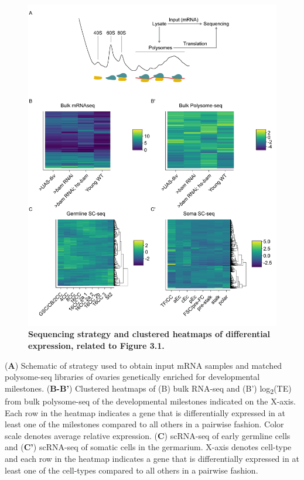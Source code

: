 \documentclass[12pt,oneside]{reedthesis}
\begin{document}
\begin{figure}

{\centering \includegraphics[width=1\linewidth]{./figure/Oo_site/Supplemental_Figure1} 

}

\caption[\textbf{Sequencing strategy and clustered heatmaps of differential expression, related to Figure 3.1.}]{\textbf{Sequencing strategy and clustered heatmaps of differential expression, related to Figure 3.1.}}\label{fig:oosite-fig-2}
\end{figure}

\setlength\parindent{0pt}(\textbf{A}) Schematic of strategy used to obtain input mRNA samples and matched polysome-seq libraries of ovaries genetically enriched for developmental milestones. (\textbf{B-B'}) Clustered heatmaps of (B) bulk RNA-seq and (B') log\textsubscript{2}(TE) from bulk polysome-seq of the developmental milestones indicated on the X-axis. Each row in the heatmap indicates a gene that is differentially expressed in at least one of the milestones compared to all others in a pairwise fashion. Color scale denotes average relative expression. (\textbf{C}) scRNA-seq of early germline cells and (\textbf{C'}) scRNA-seq of somatic cells in the germarium. X-axis denotes cell-type and each row in the heatmap indicates a gene that is differentially expressed in at least one of the cell-types compared to all others in a pairwise fashion.
\end{document}
